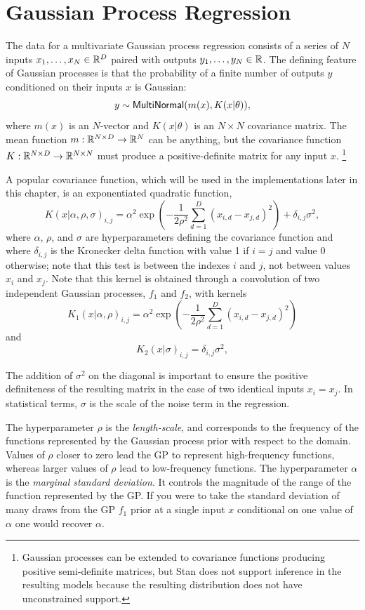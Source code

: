\section{Gaussian Process Regression}

The data for a multivariate Gaussian process regression consists of a
series of $N$ inputs $x_1,\ldots,x_N \in \mathbb{R}^D$ paired with outputs
$y_1,\ldots,y_N \in \mathbb{R}$.  The defining feature of Gaussian
processes is that the probability of a finite number of outputs $y$
conditioned on their inputs $x$ is Gaussian:
\[
y \sim \mbox{\sf MultiNormal}(m(x), K(x | \theta)),
\]
where $m(x)$ is an $N$-vector and $K(x | \theta)$ is an $N \times N$
covariance matrix.  The mean function $m : \mathbb{R}^{N \times D}
\rightarrow \mathbb{R}^{N}$ can be anything, but the covariance function
$K : \mathbb{R}^{N \times D} \rightarrow \mathbb{R}^{N \times N}$ must produce
a positive-definite matrix for any input $x$.%
%
\footnote{Gaussian processes can be extended to covariance functions
  producing positive semi-definite matrices, but Stan does not support
  inference in the resulting models because the resulting distribution
  does not have unconstrained support.}

A popular covariance function, which will be used in the implementations later
in this chapter, is an exponentiated quadratic function,
\[
  K(x | \alpha, \rho, \sigma)_{i, j}
= \alpha^2
\exp \left(
- \dfrac{1}{2 \rho^2} \sum_{d=1}^D (x_{i,d} - x_{j,d})^2
\right)
+ \delta_{i, j} \sigma^2,
\]
where $\alpha$, $\rho$, and $\sigma$ are hyperparameters defining the
covariance function and where $\delta_{i, j}$ is the Kronecker delta
function with value 1 if $i = j$ and value 0 otherwise; note that this
test is between the indexes $i$ and $j$, not between values $x_i$ and
$x_j$. Note that this kernel is obtained through a convolution of two
independent Gaussian processes, $f_1$ and $f_2$, with kernels
\[
  K_1(x | \alpha, \rho)_{i, j}
= \alpha^2
\exp \left(
- \dfrac{1}{2 \rho^2} \sum_{d=1}^D (x_{i,d} - x_{j,d})^2
\right)
\]
and
\[
  K_2(x | \sigma)_{i, j}
=
 \delta_{i, j} \sigma^2,
\]

The addition of $\sigma^2$ on the diagonal is important
to ensure the positive definiteness of the resulting matrix in the case of
two identical inputs $x_i = x_j$.  In statistical terms, $\sigma$ is
the scale of the noise term in the regression.

The hyperparameter $\rho$ is the \emph{length-scale}, and corresponds to the
frequency of the functions represented by the Gaussian process prior with
respect to the domain. Values of $\rho$ closer to zero lead the GP to represent
high-frequency functions, whereas larger values of $\rho$ lead to low-frequency
functions. The hyperparameter $\alpha$ is the \emph{marginal standard
deviation}. It controls the magnitude of the range of the function represented
by the GP. If you were to take the standard deviation of many draws from the GP
$f_1$ prior at a single input $x$ conditional on one value of $\alpha$ one
would recover $\alpha$.

